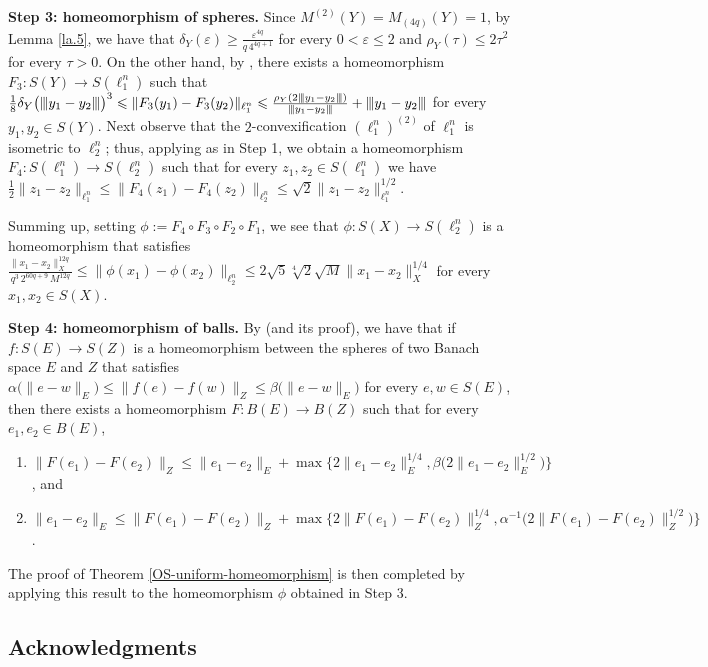\documentclass[11pt,leqno]{amsart}
\theoremstyle{remark}
\theoremstyle{plain}
\newcommand{\seminorm}[1]{{\left\vert\kern-0.25ex\left\vert\kern-0.25ex\left\vert #1
    \right\vert\kern-0.25ex\right\vert\kern-0.25ex\right\vert}}
\begin{document}
\noindent \textbf{Step 3: homeomorphism of spheres.} Since $M^{(2)}(Y)=M_{(4q)}(Y)=1$, by Lemma \ref{la.5}, we have that
$\delta_Y(\varepsilon) \geqslant \frac{\varepsilon^{4q}}{q\, 4^{4q+1}}$ for every $0< \varepsilon \leqslant 2$ and
$\rho_Y(\tau) \leqslant 2\tau^2$ for every $\tau>0$. On the other hand, by \cite[Lemma 9.5 and Proposition A.5]{BL00},
there exists a homeomorphism $F_3\colon S(Y)\to S(\ell^n_1)$ such that
$\frac{1}{8} \delta_Y\big(\seminorm{y_1-y_2}\big)^3 \leqslant \|F_3(y_1)-F_3(y_2)\|_{\ell^n_1} \leqslant
\frac{\rho_Y(2\seminorm{y_1-y_2})}{\seminorm{y_1-y_2}} + \seminorm{y_1-y_2}$ for every $y_1,y_2\in S(Y)$.
Next observe that the $2$-convexification $(\ell^n_1)^{(2)}$ of $\ell^n_1$ is isometric to $\ell^n_2$; thus, applying
\cite[Proposition~9.3]{BL00} as in Step 1, we obtain a homeomorphism $F_4\colon S(\ell^n_1)\to S(\ell^n_2)$ such that
for every $z_1,z_2\in S(\ell^n_1)$ we have
$\frac{1}{2}\|z_1-z_2\|_{\ell^n_1}\leqslant \|F_4(z_1)-F_4(z_2)\|_{\ell^n_2} \leqslant \sqrt{2} \|z_1-z_2\|_{\ell^n_1}^{1/2}$.

Summing up, setting $\phi:=F_4\circ F_3 \circ F_2\circ F_1$,
we see that $\phi\colon S(X)\to S(\ell^n_2)$ is a homeomorphism that satisfies
$\frac{\|x_1-x_2\|_X^{12q}}{q^3\, 2^{60q+9}\, M^{12q}} \leqslant
\|\phi(x_1) -\phi(x_2)\|_{\ell_2^n} \leqslant 2\sqrt{5}\sqrt[4]{2} \sqrt{M} \|x_1-x_2\|_X^{1/4}$
for every $x_1,x_2\in S(X)$.\!
\medskip

\noindent \textbf{Step 4: homeomorphism of balls.} By \cite[Proposition 2.9]{OS94} (and its proof), we have that
if $f\colon S(E)\to S(Z)$ is a homeomorphism between the spheres of two Banach space $E$ and $Z$
that satisfies $\alpha\big(\|e-w\|_E\big)\leqslant \|f(e)-f(w)\|_Z \leqslant \beta\big(\|e-w\|_E\big)$ for every $e,w\in S(E)$,
then there exists a homeomorphism $F\colon B(E)\to B(Z)$ such that for every $e_1,e_2\in B(E)$,
\begin{enumerate}
\item[$\bullet$] $\|F(e_1)-F(e_2)\|_Z \leqslant \|e_1-e_2\|_E + \max\Big\{ 2\|e_1-e_2\|_E^{1/4},
\beta\big( 2\|e_1-e_2\|^{1/2}_E\big)\Big\}$, and
\item[$\bullet$] $\|e_1-e_2\|_E \leqslant \|F(e_1)-F(e_2)\|_Z + \max\Big\{ 2\|F(e_1)-F(e_2)\|_Z^{1/4},
\alpha^{-1}\big( 2\|F(e_1)-F(e_2)\|_Z^{1/2}\big)\Big\}$.
\end{enumerate}
The proof of Theorem \ref{OS-uniform-homeomorphism} is then completed
by applying this result to the homeomorphism $\phi$ obtained in Step 3.

\subsection*{Acknowledgments}
\end{document}
